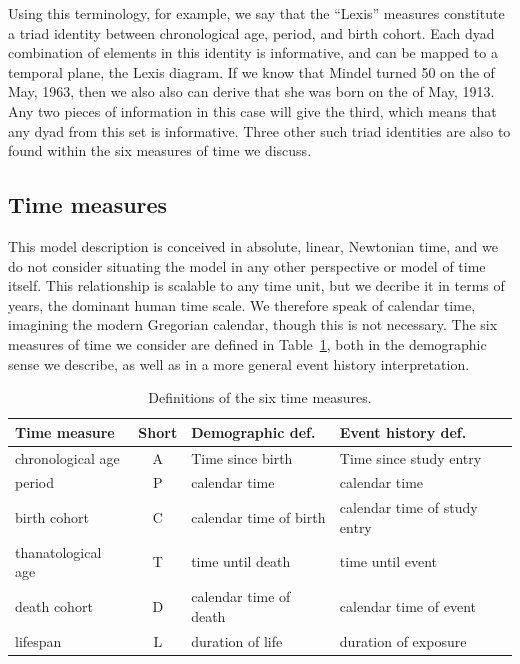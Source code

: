 \documentclass[11pt,oneside,a4paper]{article} %
\begin{document}
Using this terminology, for example, we say that the ``Lexis'' measures
constitute a triad identity between chronological age, period, and birth cohort. Each dyad
combination of elements in this identity is informative, and can be mapped to a
temporal plane, the Lexis diagram. If we know that Mindel turned 50 on the
 of May, 1963, then we also also can derive that she was born on the  of
May, 1913. Any two pieces of information in this case will give the third, which
means that any dyad from this set is informative. Three other such triad
identities are also to found within the six measures of time we discuss.
\FloatBarrier

\subsection*{Time measures}
\FloatBarrier
This model description is conceived in absolute, linear, Newtonian time, and we
do not consider situating the model in any other perspective or model of time
itself.
This relationship is scalable to any time unit, but we decribe it in terms of
years, the dominant human time scale. We therefore speak of calendar time,
imagining the modern Gregorian calendar, though this is not necessary. The six
measures of time we consider are defined in Table~\ref{tab:sixdefs}, both in the
demographic sense we describe, as well as in a more general event history
interpretation.

\begin{table}
\centering
\caption{Definitions of the six time measures.}
\label{tab:sixdefs}
\begin{tabular}{lcll}
\hline 
\textbf{Time measure} & \textbf{Short} & \textbf{Demographic def.} &
\textbf{Event history def.}\\
\hline 
chronological age & A & Time since birth & Time since study entry \\
period & P & calendar time & calendar time \\
birth cohort & C & calendar time of birth & calendar time of study entry \\
thanatological age & T & time until death & time until event \\
death cohort & D & calendar time of death & calendar time of event \\
lifespan & L & duration of life & duration of exposure \\
\end{tabular}
\end{table}
\end{document}
